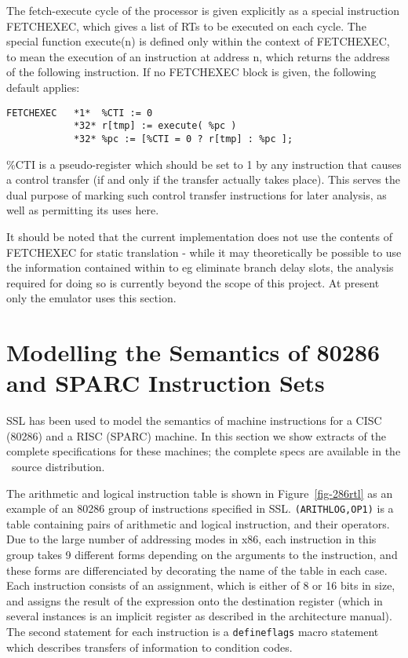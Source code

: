 The fetch-execute cycle of the processor is given explicitly
as a special instruction FETCHEXEC, which gives a list of RTs
to be executed on each cycle. The special function execute(n)
is defined only within the context of FETCHEXEC, to mean the
execution of an instruction at address n, which returns the
address of the following instruction. If no FETCHEXEC block
is given, the following default applies:

{\small
\begin{verbatim}
FETCHEXEC   *1*  %CTI := 0
            *32* r[tmp] := execute( %pc )
            *32* %pc := [%CTI = 0 ? r[tmp] : %pc ];
\end{verbatim} }

\%CTI is a pseudo-register which should be set to 1 by any
instruction that causes a control transfer (if and only if the
transfer actually takes place). This serves the dual purpose of
marking such control transfer instructions for later analysis, as
well as permitting its uses here.

It should be noted that the current implementation does not use
the contents of FETCHEXEC for static translation - while it may
theoretically be possible to use the information contained within
to eg eliminate branch delay slots, the analysis required for doing
so is currently beyond the scope of this project. At present only
the emulator uses this section.

\section{Modelling the Semantics of 80286 and SPARC Instruction Sets}
SSL has been used to model the semantics of machine instructions
for a CISC (80286) and a RISC (SPARC) machine.  In this section
we show extracts of the complete specifications for these machines;
the complete specs are available in the \uqbt\ source distribution.

The arithmetic and logical instruction table is shown in 
Figure~\ref{fig-286rtl} as an example of an 80286 group of
instructions specified in SSL.
\texttt{(ARITHLOG,OP1)} is a table containing pairs of arithmetic and 
logical instruction, and their operators.  
Due to the large number of addressing modes in x86, each 
instruction in this group takes 9 different forms depending on
the arguments to the instruction, and these forms are differenciated
by decorating the name of the table in each case.
Each instruction consists of an assignment, which is either of
8 or 16 bits in size, and assigns the result of the expression onto
the destination register (which in several instances is an implicit
register as described in the architecture manual).  The second
statement for each instruction is a \texttt{defineflags} macro
statement which describes transfers of information to condition
codes.

